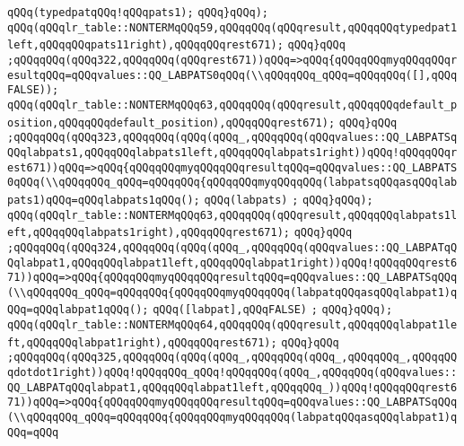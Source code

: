 \verb|qQQq(typedpatqQQq!qQQqpats1);|\newline
\verb|qQQq}qQQq);|\newline
\verb|qQQq(qQQqlr_table::NONTERMqQQq59,qQQqqQQq(qQQqresult,qQQqqQQqtypedpat1left,qQQqqQQqpats11right),qQQqqQQqrest671);|\newline
\verb|qQQq}qQQq|\newline
\verb|;qQQqqQQq(qQQq322,qQQqqQQq(qQQqrest671))qQQq=>qQQq{qQQqqQQqmyqQQqqQQqresultqQQq=qQQqvalues::QQ_LABPATS0qQQq(\\qQQqqQQq_qQQq=qQQqqQQq([],qQQqFALSE));|\newline
\verb|qQQq(qQQqlr_table::NONTERMqQQq63,qQQqqQQq(qQQqresult,qQQqqQQqdefault_position,qQQqqQQqdefault_position),qQQqqQQqrest671);|\newline
\verb|qQQq}qQQq|\newline
\verb|;qQQqqQQq(qQQq323,qQQqqQQq(qQQq(qQQq_,qQQqqQQq(qQQqvalues::QQ_LABPATSqQQqlabpats1,qQQqqQQqlabpats1left,qQQqqQQqlabpats1right))qQQq!qQQqqQQqrest671))qQQq=>qQQq{qQQqqQQqmyqQQqqQQqresultqQQq=qQQqvalues::QQ_LABPATS0qQQq(\\qQQqqQQq_qQQq=qQQqqQQq{qQQqqQQqmyqQQqqQQq(labpatsqQQqasqQQqlabpats1)qQQq=qQQqlabpats1qQQq();|\newline
\verb|qQQq(labpats)|\newline
\verb|;|\newline
\verb|qQQq}qQQq);|\newline
\verb|qQQq(qQQqlr_table::NONTERMqQQq63,qQQqqQQq(qQQqresult,qQQqqQQqlabpats1left,qQQqqQQqlabpats1right),qQQqqQQqrest671);|\newline
\verb|qQQq}qQQq|\newline
\verb|;qQQqqQQq(qQQq324,qQQqqQQq(qQQq(qQQq_,qQQqqQQq(qQQqvalues::QQ_LABPATqQQqlabpat1,qQQqqQQqlabpat1left,qQQqqQQqlabpat1right))qQQq!qQQqqQQqrest671))qQQq=>qQQq{qQQqqQQqmyqQQqqQQqresultqQQq=qQQqvalues::QQ_LABPATSqQQq(\\qQQqqQQq_qQQq=qQQqqQQq{qQQqqQQqmyqQQqqQQq(labpatqQQqasqQQqlabpat1)qQQq=qQQqlabpat1qQQq();|\newline
\verb|qQQq([labpat],qQQqFALSE)|\newline
\verb|;|\newline
\verb|qQQq}qQQq);|\newline
\verb|qQQq(qQQqlr_table::NONTERMqQQq64,qQQqqQQq(qQQqresult,qQQqqQQqlabpat1left,qQQqqQQqlabpat1right),qQQqqQQqrest671);|\newline
\verb|qQQq}qQQq|\newline
\verb|;qQQqqQQq(qQQq325,qQQqqQQq(qQQq(qQQq_,qQQqqQQq(qQQq_,qQQqqQQq_,qQQqqQQqdotdot1right))qQQq!qQQqqQQq_qQQq!qQQqqQQq(qQQq_,qQQqqQQq(qQQqvalues::QQ_LABPATqQQqlabpat1,qQQqqQQqlabpat1left,qQQqqQQq_))qQQq!qQQqqQQqrest671))qQQq=>qQQq{qQQqqQQqmyqQQqqQQqresultqQQq=qQQqvalues::QQ_LABPATSqQQq(\\qQQqqQQq_qQQq=qQQqqQQq{qQQqqQQqmyqQQqqQQq(labpatqQQqasqQQqlabpat1)qQQq=qQQq|\newline
